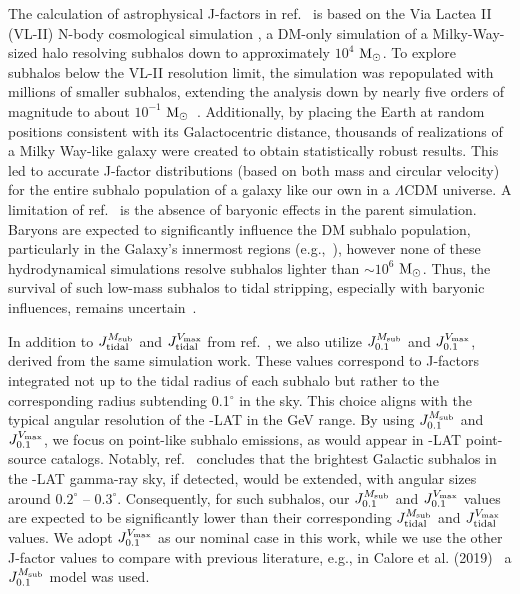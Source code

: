 The calculation of astrophysical J-factors in ref.~\cite{2024MNRAS.530.2496A} is based on the Via Lactea II (VL-II) N-body cosmological simulation \cite{2007ApJ...667..859D}, a DM-only simulation of a Milky-Way-sized halo resolving subhalos down to approximately $10^4$ ${\rm M}_{\odot}$. 
To explore subhalos below the VL-II resolution limit, 
the simulation was repopulated with millions of smaller subhalos, extending the analysis down by nearly five orders of magnitude 
to about $10^{-1}$ ${\rm M}_{\odot}$~\cite{2022PhRvD.105h3006C}.
Additionally, by placing the Earth at random positions consistent with its Galactocentric distance, 
thousands of realizations of a Milky Way-like galaxy were created to obtain statistically robust results. 
This led to accurate J-factor distributions (based on both mass and circular velocity) for the entire subhalo population of a galaxy like our own in a $\Lambda$CDM universe. A limitation of ref.~\cite{2024MNRAS.530.2496A} is the absence of baryonic effects in the parent simulation. Baryons are expected to significantly influence the DM subhalo population, particularly in the Galaxy's innermost regions (e.g.,~\cite{2019MNRAS.487.4409K,2017MNRAS.471.1709G,2021MNRAS.501.3558G}), however none of these hydrodynamical simulations resolve subhalos lighter than $\sim 10^6$ ${\rm M}_{\odot}$. Thus, the survival of such low-mass subhalos to tidal stripping, especially with baryonic influences, remains uncertain~\cite{2018MNRAS.474.3043V,2020MNRAS.491.4591E,2023MNRAS.518...93A}.

In addition to $J_{\rm tidal}^{M_\textrm{sub}}$ and $J_{\rm tidal}^{V_\textrm{max}}$ from ref.~\cite{2024MNRAS.530.2496A}, we also utilize $J_{0.1}^{M_\textrm{sub}}$ and $J_{0.1}^{V_\textrm{max}}$, derived from the same simulation work. These values correspond to J-factors integrated not up to the tidal radius of each subhalo but rather to the corresponding radius subtending 0.1$^\circ$ in the sky. 
This choice aligns with the typical angular resolution of the {\Fermi}-LAT in the GeV range. By using $J_{0.1}^{M_\textrm{sub}}$ and $J_{0.1}^{V_\textrm{max}}$, we focus on point-like subhalo emissions, as would appear in \Fermi-LAT point-source catalogs. 
Notably, ref.~\cite{2022PhRvD.105h3006C} concludes that the brightest Galactic subhalos in the \Fermi-LAT gamma-ray sky, if detected, would be extended, with angular sizes around $0.2^\circ$ – $0.3^\circ$. 
Consequently, for such subhalos, our $J_{0.1}^{M_\textrm{sub}}$ and $J_{0.1}^{V_\textrm{max}}$ values are expected to be significantly lower than their corresponding $J_{\rm tidal}^{M_\textrm{sub}}$ and $J_{\rm tidal}^{V_\textrm{max}}$ values. 
We adopt $J_{0.1}^{V_\textrm{max}}$ as our nominal case in this work, while we use the other J-factor values to compare with previous literature, e.g., in Calore et al. (2019)~\cite{2019Galax...7...90C} a $J_{0.1}^{M_{\rm sub}}$ model was used.

